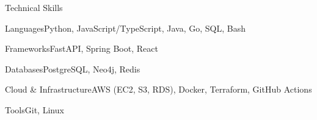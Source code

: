\documentclass[
	11pt
]{../../../template}
\begin{document}
	\begin{rSection}{T}{echnical Skills}
		\begin{rSet}{Languages}{Python, JavaScript/TypeScript, Java, Go, SQL, Bash}
		\end{rSet}
		\begin{rSet}{Frameworks}{FastAPI, Spring Boot, React}
		\end{rSet}
		\begin{rSet}{Databases}{PostgreSQL, Neo4j, Redis}
		\end{rSet}
		\begin{rSet}{Cloud \& Infrastructure}{AWS (EC2, S3, RDS), Docker, Terraform, GitHub Actions}
		\end{rSet}
		\begin{rSet}{Tools}{Git, Linux}
		\end{rSet}
	\end{rSection}
\end{document}
